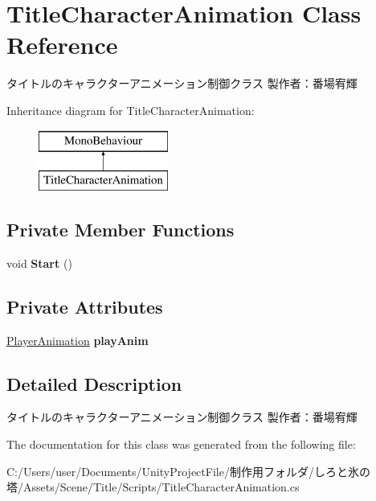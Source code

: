 \hypertarget{class_title_character_animation}{}\section{Title\+Character\+Animation Class Reference}
\label{class_title_character_animation}


タイトルのキャラクターアニメーション制御クラス 製作者：番場宥輝  


Inheritance diagram for Title\+Character\+Animation\+:\begin{figure}[H]
\begin{center}
\leavevmode
\includegraphics[height=2.000000cm]{class_title_character_animation}
\end{center}
\end{figure}
\subsection*{Private Member Functions}
\begin{DoxyCompactItemize}
\item 
\mbox{\label{class_title_character_animation_a70041209f3d3fc0025cab4b7291ef5ae}} 
void {\bfseries Start} ()
\end{DoxyCompactItemize}
\subsection*{Private Attributes}
\begin{DoxyCompactItemize}
\item 
\mbox{\label{class_title_character_animation_a9691862e1a7ec5b26ce12a5feab9a8bb}} 
\hyperlink{class_player_animation}{Player\+Animation} {\bfseries play\+Anim}
\end{DoxyCompactItemize}


\subsection{Detailed Description}
タイトルのキャラクターアニメーション制御クラス 製作者：番場宥輝 



The documentation for this class was generated from the following file\+:\begin{DoxyCompactItemize}
\item 
C\+:/\+Users/user/\+Documents/\+Unity\+Project\+File/制作用フォルダ/しろと氷の塔/\+Assets/\+Scene/\+Title/\+Scripts/Title\+Character\+Animation.\+cs\end{DoxyCompactItemize}
